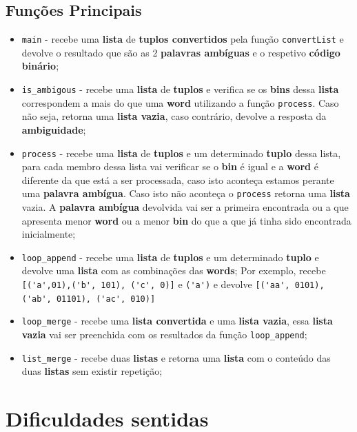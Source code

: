 \documentclass[11pt]{article}   %
\begin{document}
\subsection{Funções Principais}

\begin{itemize}
    \item \verb|main| - recebe uma \textbf{lista} de \textbf{tuplos convertidos} pela função 
    \verb|convertList| e devolve o resultado que são as 2 \textbf{palavras ambíguas} e o respetivo 
    \textbf{código binário};
    \item \verb|is_ambigous| - recebe uma \textbf{lista} de \textbf{tuplos} e verifica se os 
    \textbf{bins} dessa \textbf{lista} correspondem a mais do que uma \textbf{word} utilizando 
    a função \verb|process|. Caso não seja, retorna uma \textbf{lista vazia}, caso contrário, 
    devolve a resposta da \textbf{ambiguidade};
    \item \verb|process| - recebe uma \textbf{lista} de \textbf{tuplos} e um determinado 
    \textbf{tuplo} dessa lista, para cada membro dessa lista vai verificar se o \textbf{bin}
    é igual e a \textbf{word} é diferente da que está a ser processada, caso isto aconteça
    estamos perante uma \textbf{palavra ambígua}. Caso isto não aconteça o \verb|process|
    retorna uma \textbf{lista} vazia.
    A \textbf{palavra ambígua} devolvida vai ser a primeira encontrada ou a que apresenta
    menor \textbf{word} ou a menor \textbf{bin} do que a que já tinha sido encontrada inicialmente;
    \item \verb|loop_append| - recebe uma \textbf{lista} de \textbf{tuplos} e um determinado
    \textbf{tuplo} e devolve uma \textbf{lista} com as combinações das \textbf{words};
    Por exemplo, recebe \verb|[('a',01),('b', 101), ('c', 0)]| e \verb|('a')| e devolve 
    \verb|[('aa', 0101), ('ab', 01101), ('ac', 010)]|
    \item \verb|loop_merge| - recebe uma \textbf{lista convertida} e uma \textbf{lista vazia}, essa
    \textbf{lista vazia} vai ser preenchida com os resultados da função \verb|loop_append|;
    \item \verb|list_merge| - recebe duas \textbf{listas} e retorna uma \textbf{lista} com o 
    conteúdo das duas \textbf{listas} sem existir repetição;
\end{itemize}
\section{Dificuldades sentidas}
\end{document}
